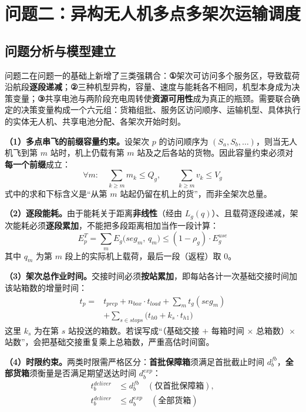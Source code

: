 \section{问题二：异构无人机多点多架次运输调度}
\label{sec:q2}

\subsection{问题分析与模型建立}

问题二在问题一的基础上新增了三类强耦合：\textbf{①}架次可访问多个服务区，导致载荷沿航段\textbf{逐段递减}；\textbf{②}三种机型异构，容量、速度与能耗各不相同，机型本身成为决策变量；\textbf{③}共享电池与两阶段充电周转使\textbf{资源可用性}成为真正的瓶颈。需要联合确定的决策变量构成一个六元组：货箱组批、服务区访问顺序、运输机型、具体执行的实体无人机、共享电池分配、各架次开始时刻。

\textbf{（1）多点串飞的前缀容量约束。}设架次 $p$ 的访问顺序为 $(S_a,S_b,\dots)$，则当无人机飞到第 $m$ 站时，机上仍载有第 $m$ 站及之后各站的货物。因此容量约束必须对\textbf{每一个前缀}成立：
\begin{equation}
	\label{eq:21}
	\forall m:\quad\sum_{k\ge m}m_{k}\le Q_{g},\qquad \sum_{k\ge m}v_{k}\le V_{g}
\end{equation}
式中的求和下标含义是“从第 $m$ 站起仍留在机上的货”，而非全架次总量。

\textbf{（2）逐段能耗。}由于能耗关于距离\textbf{非线性}（经由 $L_{g}(q)$）、且载荷逐段递减，架次能耗必须\textbf{逐段累加}，不能把多段距离相加当作一段计算：
\begin{equation}
	\label{eq:22}
	E_{p}^{T}=\sum_{m}E_{g}\big(seg_{m},\,q_{m}\big)\le(1-\rho_{g})\cdot E_{g}^{use}
\end{equation}
其中 $q_{m}$ 为第 $m$ 段上的实际机上载荷，最后一段（返程）取 0。

\textbf{（3）架次总作业时间。}交接时间必须\textbf{按站累加}，即每站各计一次基础交接时间加该站箱数的增量时间：
\begin{equation}
	\label{eq:23}
	\begin{aligned}
		t_{p}={}&t_{prep}+n_{box}\cdot t_{load}+\sum_{m}t_{g}(seg_{m})\\
		      &+\sum_{s\in stops}\big(t_{h0}+k_{s}\cdot t_{h1}\big)
	\end{aligned}
\end{equation}
这里 $k_{s}$ 为在第 $s$ 站投送的箱数。若误写成“（基础交接 $+$ 每箱时间 $\times$ 总箱数）$\times$ 站数”，会把基础交接重复乘上总箱数，严重高估时间窗。

\textbf{（4）时限约束。}两类时限需严格区分：\textbf{首批保障箱}须满足首批截止时间 $d_{b}^{fb}$，\textbf{全部货箱}须衡量是否满足期望送达时间 $d_{b}^{exp}$：
\begin{equation}
	\label{eq:24}
	\begin{aligned}
		t_{b}^{deliver}&\le d_{b}^{fb}\quad(\text{仅首批保障箱}),\\
		t_{b}^{deliver}&\le d_{b}^{exp}\quad(\text{全部货箱})
	\end{aligned}
\end{equation}

